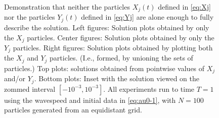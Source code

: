 \documentclass[11pt]{amsart}
\begin{document}
\begin{figure}
  \caption{Demonstration that neither the particles $X_j(t)$ defined in \eqref{eq:Xj} nor the particles $Y_j(t)$ defined in \eqref{eq:Yj} are alone enough to fully describe the solution. Left figures: Solution plots obtained by only the $X_j$ particles. Center figures: Solution plots obtained by only the $Y_j$ particles. Right figures: Solution plots obtained by plotting both the $X_j$ and $Y_j$ particles. (I.e., formed, by unioning the sets of particles.) Top plots: solutions obtained from pointwise values of $X_j$ and/or $Y_j$. Bottom plots: Inset with the solution viewed on the zommed interval $[-10^{-3}, 10^{-3}]$. All experiments run to time $T = 1$ using the wavespeed and initial data in \eqref{eq:au0-1}, with $N = 100$ particles generated from an equidistant grid.}\label{fig:f1}
\end{figure}
\end{document}
